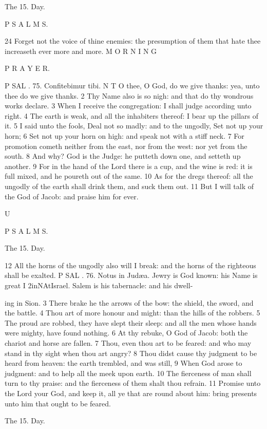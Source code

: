 The 15. Day.

P S A L M S.

24 Forget not the voice of thine enemies: the presumption of them that hate thee increaseth ever more and more. M O R N I N G

P R A Y E R.

P SAL . 75. Confitebimur tibi. N T O thee, O God, do we give thanks: yea, unto thee do we give thanks. 2 Thy Name also is so nigh: and that do thy wondrous works declare. 3 When I receive the congregation: I shall judge according unto right. 4 The earth is weak, and all the inhabiters thereof: I bear up the pillars of it. 5 I said unto the fools, Deal not so madly: and to the ungodly, Set not up your horn; 6 Set not up your horn on high: and speak not with a stiff neck. 7 For promotion cometh neither from the east, nor from the west: nor yet from the south. 8 And why? God is the Judge: he putteth down one, and setteth up another. 9 For in the hand of the Lord there is a cup, and the wine is red: it is full mixed, and he poureth out of the same. 10 As for the dregs thereof: all the ungodly of the earth shall drink them, and suck them out. 11 But I will talk of the God of Jacob: and praise him for ever.

U

P S A L M S.

The 15. Day.

12 All the horns of the ungodly also will I break: and the horns of the righteous shall be exalted. P SAL . 76. Notus in Judæa. Jewry is God known: his Name is great I 2inNAtIsrael. Salem is his tabernacle: and his dwell-

ing in Sion. 3 There brake he the arrows of the bow: the shield, the sword, and the battle. 4 Thou art of more honour and might: than the hills of the robbers. 5 The proud are robbed, they have slept their sleep: and all the men whose hands were mighty, have found nothing. 6 At thy rebuke, O God of Jacob: both the chariot and horse are fallen. 7 Thou, even thou art to be feared: and who may stand in thy sight when thou art angry? 8 Thou didst cause thy judgment to be heard from heaven: the earth trembled, and was still, 9 When God arose to judgment: and to help all the meek upon earth. 10 The fierceness of man shall turn to thy praise: and the fierceness of them shalt thou refrain. 11 Promise unto the Lord your God, and keep it, all ye that are round about him: bring presents unto him that ought to be feared.

The 15. Day.


